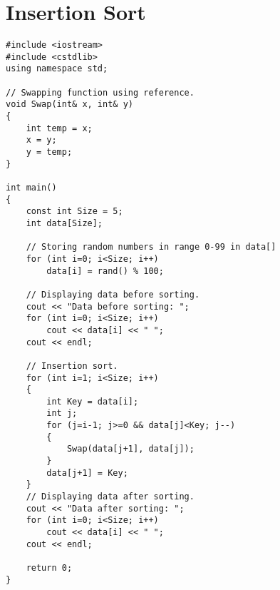 \documentclass[12pt,a4paper]{article}
\begin{document}
\section{Insertion Sort}
\begin{lstlisting}[caption={Insertion Sort},escapechar=$]
#include <iostream>
#include <cstdlib>
using namespace std;

// Swapping function using reference.
void Swap(int& x, int& y)
{
	int temp = x;
	x = y;
	y = temp;
}

int main()
{
	const int Size = 5;
	int data[Size];

	// Storing random numbers in range 0-99 in data[]
	for (int i=0; i<Size; i++)
		data[i] = rand() % 100;
		
	// Displaying data before sorting.
	cout << "Data before sorting: ";
	for (int i=0; i<Size; i++)
		cout << data[i] << " ";
	cout << endl;

	// Insertion sort.
	for (int i=1; i<Size; i++)
	{
		int Key = data[i];
		int j;
		for (j=i-1; j>=0 && data[j]<Key; j--)
		{
			Swap(data[j+1], data[j]);	
		}
		data[j+1] = Key;
	}
	// Displaying data after sorting.
	cout << "Data after sorting: ";
	for (int i=0; i<Size; i++)
		cout << data[i] << " ";
	cout << endl;

	return 0;
}
\end{lstlisting}
\end{document}
